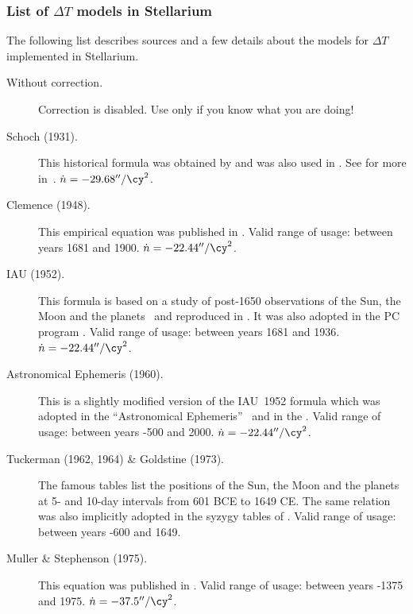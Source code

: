 \subsubsection{List of $\Delta T$ models in Stellarium}
The following list describes sources and a few details about the models for $\Delta T$ implemented in Stellarium.
\begin{description}
\item[Without correction.] Correction is disabled. Use only if you know what you are doing!

\item[Schoch (1931).] This historical formula was obtained by
  \citet{Schoch:1931} and was also used in . See for more
  in~\citet{Peters:2010}.   $\dot{n}=-29.68''/\cy^2$.

\item[Clemence (1948).] This empirical equation was published in . 
  Valid range of usage: between years 1681 and 1900. $\dot{n}=-22.44''/\cy^2$.

\item[IAU (1952).] This formula is based on a study of post-1650
  observations of the Sun, the Moon and the planets~\citep{1939MNRAS..99..541S} 
  and reproduced in . %
  It was also adopted in the PC program . Valid range of usage: between years
  1681 and 1936. $\dot{n}=-22.44''/\cy^2$.

\item[Astronomical Ephemeris (1960).] This is a slightly modified
  version of the IAU~1952 \citep{1939MNRAS..99..541S} formula which was
  adopted in the ``Astronomical Ephemeris''~\citep{ESAE:1961} and in
  the . Valid range of usage: between years
  -500 and 2000. $\dot{n}=-22.44''/\cy^2$.

\item[Tuckerman (1962, 1964) \& Goldstine (1973).] The famous tables 
\citep{Tuckerman:1962, Tuckerman:1964} list the positions
  of the Sun, the Moon and the planets at 5- and 10-day intervals from
  601 BCE to 1649 CE. The same relation was also implicitly adopted in
  the syzygy tables of \citet{Goldstine:1973}. Valid range of
  usage: between years -600 and 1649.

\item[Muller \& Stephenson (1975).] This equation was published in 
  . Valid range of usage:
  between years -1375 and 1975. $\dot{n}=-37.5''/\cy^2$.


\end{description}
